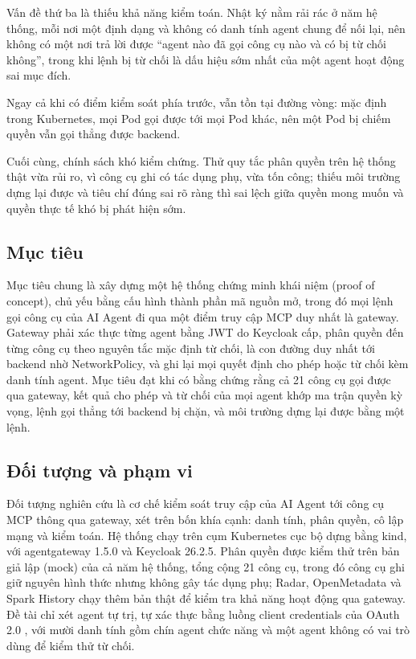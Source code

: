 Vấn đề thứ ba là thiếu khả năng kiểm toán. Nhật ký nằm rải rác ở năm hệ thống, mỗi nơi một định dạng và không có danh tính agent chung để nối lại, nên không có một nơi trả lời được ``agent nào đã gọi công cụ nào và có bị từ chối không'', trong khi lệnh bị từ chối là dấu hiệu sớm nhất của một agent hoạt động sai mục đích.

Ngay cả khi có điểm kiểm soát phía trước, vẫn tồn tại đường vòng: mặc định trong Kubernetes, mọi Pod gọi được tới mọi Pod khác, nên một Pod bị chiếm quyền vẫn gọi thẳng được backend.

Cuối cùng, chính sách khó kiểm chứng. Thử quy tắc phân quyền trên hệ thống thật vừa rủi ro, vì công cụ ghi có tác dụng phụ, vừa tốn công; thiếu môi trường dựng lại được và tiêu chí đúng sai rõ ràng thì sai lệch giữa quyền mong muốn và quyền thực tế khó bị phát hiện sớm.

\subsection{Mục tiêu}

Mục tiêu chung là xây dựng một hệ thống chứng minh khái niệm (proof of concept), chủ yếu bằng cấu hình thành phần mã nguồn mở, trong đó mọi lệnh gọi công cụ của AI Agent đi qua một điểm truy cập MCP duy nhất là gateway. Gateway phải xác thực từng agent bằng JWT do Keycloak cấp, phân quyền đến từng công cụ theo nguyên tắc mặc định từ chối, là con đường duy nhất tới backend nhờ NetworkPolicy, và ghi lại mọi quyết định cho phép hoặc từ chối kèm danh tính agent. Mục tiêu đạt khi có bằng chứng rằng cả 21 công cụ gọi được qua gateway, kết quả cho phép và từ chối của mọi agent khớp ma trận quyền kỳ vọng, lệnh gọi thẳng tới backend bị chặn, và môi trường dựng lại được bằng một lệnh.

\subsection{Đối tượng và phạm vi}

Đối tượng nghiên cứu là cơ chế kiểm soát truy cập của AI Agent tới công cụ MCP thông qua gateway, xét trên bốn khía cạnh: danh tính, phân quyền, cô lập mạng và kiểm toán. Hệ thống chạy trên cụm Kubernetes cục bộ dựng bằng kind, với agentgateway 1.5.0 và Keycloak 26.2.5. Phân quyền được kiểm thử trên bản giả lập (mock) của cả năm hệ thống, tổng cộng 21 công cụ, trong đó công cụ ghi giữ nguyên hình thức nhưng không gây tác dụng phụ; Radar, OpenMetadata và Spark History chạy thêm bản thật để kiểm tra khả năng hoạt động qua gateway. Đề tài chỉ xét agent tự trị, tự xác thực bằng luồng client credentials của OAuth 2.0 \parencite{rfc6749}, với mười danh tính gồm chín agent chức năng và một agent không có vai trò dùng để kiểm thử từ chối.

